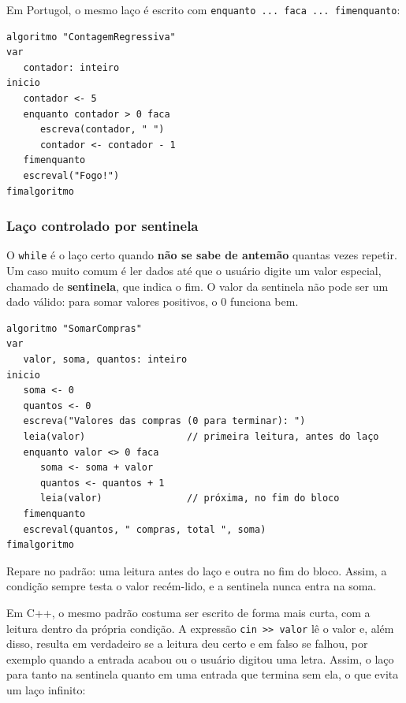 Em Portugol, o mesmo laço é escrito com \texttt{enquanto ... faca ... fimenquanto}:

\begin{codigo}
\begin{Verbatim}[breaklines=true, breaksymbolleft={}, fontsize=\footnotesize]
algoritmo "ContagemRegressiva"
var
   contador: inteiro
inicio
   contador <- 5
   enquanto contador > 0 faca
      escreva(contador, " ")
      contador <- contador - 1
   fimenquanto
   escreval("Fogo!")
fimalgoritmo
\end{Verbatim}
\end{codigo}

\subsubsection{Laço controlado por sentinela}

O \texttt{while} é o laço certo quando \textbf{não se sabe de antemão} quantas vezes repetir. Um caso muito comum é ler dados até que o usuário digite um valor especial, chamado de \textbf{sentinela}, que indica o fim. O valor da sentinela não pode ser um dado válido: para somar valores positivos, o 0 funciona bem.

\begin{codigo}
\begin{Verbatim}[breaklines=true, breaksymbolleft={}, fontsize=\footnotesize]
algoritmo "SomarCompras"
var
   valor, soma, quantos: inteiro
inicio
   soma <- 0
   quantos <- 0
   escreva("Valores das compras (0 para terminar): ")
   leia(valor)                  // primeira leitura, antes do laço
   enquanto valor <> 0 faca
      soma <- soma + valor
      quantos <- quantos + 1
      leia(valor)               // próxima, no fim do bloco
   fimenquanto
   escreval(quantos, " compras, total ", soma)
fimalgoritmo
\end{Verbatim}
\end{codigo}

Repare no padrão: uma leitura antes do laço e outra no fim do bloco. Assim, a condição sempre testa o valor recém-lido, e a sentinela nunca entra na soma.

Em C++, o mesmo padrão costuma ser escrito de forma mais curta, com a leitura dentro da própria condição. A expressão \texttt{cin >> valor} lê o valor e, além disso, resulta em verdadeiro se a leitura deu certo e em falso se falhou, por exemplo quando a entrada acabou ou o usuário digitou uma letra. Assim, o laço para tanto na sentinela quanto em uma entrada que termina sem ela, o que evita um laço infinito:

